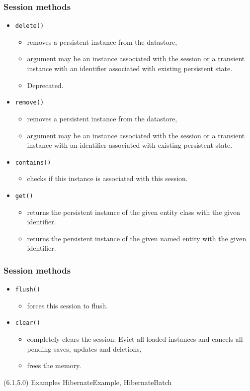 \documentclass[10pt,xcolor=pdflatex]{beamer}
\begin{document}
\begin{frame}[fragile]\frametitle{Session methods}
  \begin{itemize}
    \item \texttt{delete()}
      \begin{itemize}
        \item removes a persistent instance from the datastore,
        \item argument may be an instance associated with the session or a transient instance with an identifier associated with existing persistent state.
        \item Deprecated.
      \end{itemize}
    \item \texttt{remove()}
      \begin{itemize}
        \item removes a persistent instance from the datastore,
        \item argument may be an instance associated with the session or a transient instance with an identifier associated with existing persistent state.
      \end{itemize}
    \item \texttt{contains()}
      \begin{itemize}
        \item checks if this instance is associated with this session.
      \end{itemize}
    \item \texttt{get()}
      \begin{itemize}
        \item returns the persistent instance of the given entity class with the given identifier.
        \item returns the persistent instance of the given named entity with the given identifier.
      \end{itemize}
  \end{itemize}
\end{frame}

\begin{frame}[fragile]\frametitle{Session methods}
  \begin{itemize}
    \item \texttt{flush()}
      \begin{itemize}
        \item forces this session to flush.
      \end{itemize}
    \item \texttt{clear()}
      \begin{itemize}
        \item completely clears the session. Evict all loaded instances and cancels all pending saves, updates and deletions,
        \item frees the memory.
      \end{itemize}
  \end{itemize}
\begin{textblock}{15}(6.1,5.0)
    {\footnotesize Examples HibernateExample, HibernateBatch}
\end{textblock}
\end{frame}
\end{document}

